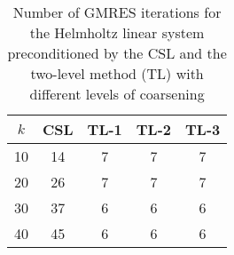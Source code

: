 \begin{table}[t]
\centering
\begin{tabular}{ccccc}
\hline
$k$ & CSL & TL-1 & TL-2 & TL-3 \\ \hline
10 & 14 & 7 & 7 & 7 \\
20 & 26 & 7 & 7 & 7 \\
30 & 37 & 6 & 6 & 6 \\
40 & 45 & 6 & 6 & 6 \\
\hline
\end{tabular}
\caption{Number of GMRES iterations for the Helmholtz linear system preconditioned by the  CSL and the two-level method (TL) with different levels of coarsening}
\label{table:gmres_csl_vs_adef_coarse_eps_10}
\end{table}
